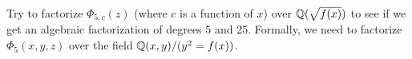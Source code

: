 



Try to factorize $\Phi_{5, c}(z)$ (where $c$ is a function of $x$)
over $\mathbb{Q}(\sqrt{f(x)})$ to see if we get an algebraic factorization of
degrees 5 and 25. Formally, we need to factorize $\Phi_5(x, y, z)$
over the field $\mathbb{Q}(x, y)/(y^2 = f(x))$.


